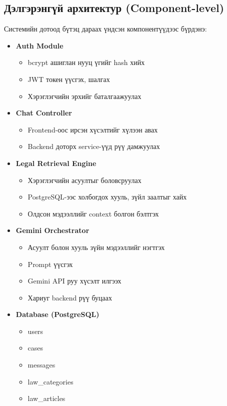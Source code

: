 
\subsection{Дэлгэрэнгүй архитектур (Component-level)}

Системийн дотоод бүтэц дараах үндсэн компонентүүдээс бүрдэнэ:

\begin{itemize}

    \item \textbf{Auth Module}
    \begin{itemize}
        \item bcrypt ашиглан нууц үгийг hash хийх
        \item JWT токен үүсгэх, шалгах
        \item Хэрэглэгчийн эрхийг баталгаажуулах
    \end{itemize}

    \item \textbf{Chat Controller}
    \begin{itemize}
        \item Frontend-оос ирсэн хүсэлтийг хүлээн авах
        \item Backend доторх service-үүд рүү дамжуулах
    \end{itemize}

    \item \textbf{Legal Retrieval Engine}
    \begin{itemize}
        \item Хэрэглэгчийн асуултыг боловсруулах
        \item PostgreSQL-ээс холбогдох хууль, зүйл заалтыг хайх
        \item Олдсон мэдээллийг context болгон бэлтгэх
    \end{itemize}

    \item \textbf{Gemini Orchestrator}
    \begin{itemize}
        \item Асуулт болон хууль зүйн мэдээллийг нэгтгэх
        \item Prompt үүсгэх
        \item Gemini API руу хүсэлт илгээх
        \item Хариуг backend рүү буцаах
    \end{itemize}

    \item \textbf{Database (PostgreSQL)}
    \begin{itemize}
        \item users
        \item cases
        \item messages
        \item law\_categories
        \item law\_articles
    \end{itemize}


\end{itemize}
